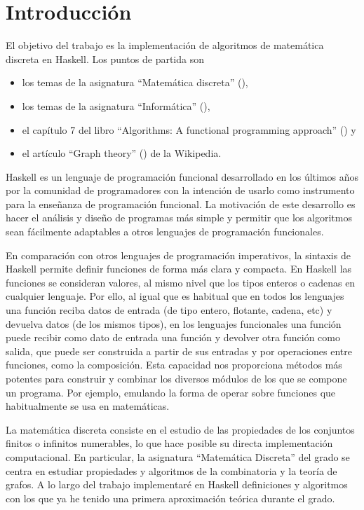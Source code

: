 \chapter*{Introducción}

El objetivo del trabajo es la implementación de algoritmos de matemática
discreta en Haskell. Los puntos de partida son 
\begin{itemize}
  \item los temas de la asignatura ``Matemática discreta'' (\cite{Cardenas-15a}),
  \item los temas de la asignatura ``Informática'' (\cite{Alonso-15a}),
  \item el capítulo 7 del libro ``Algorithms: A functional programming
    approach'' (\cite{Rabhi+Lapalme-99}) y
  \item el artículo ``Graph theory'' (\cite{Wikipedia-grafos}) de la Wikipedia.  
\end{itemize}

Haskell es un lenguaje de programación funcional desarrollado en los últimos
años por la comunidad de programadores con la intención de usarlo como
instrumento para la enseñanza de programación funcional. La motivación de este
desarrollo es hacer el análisis y diseño de programas más simple y permitir que
los algoritmos sean fácilmente adaptables a otros lenguajes de programación 
funcionales.

En comparación con otros lenguajes de programación imperativos, la sintaxis de 
Haskell permite definir funciones de forma más clara y compacta. En Haskell las
funciones se consideran valores, al mismo nivel que los tipos enteros o cadenas
en cualquier lenguaje. Por ello, al igual que es habitual que en todos los 
lenguajes una función reciba datos de entrada (de tipo entero, flotante, cadena,
etc) y devuelva datos (de los mismos tipos), en los lenguajes funcionales una
función puede recibir como dato de entrada una función y devolver otra función
como salida, que puede ser construida a partir de sus entradas y por operaciones
entre funciones, como la composición. Esta capacidad nos proporciona métodos más
potentes para construir y combinar los diversos módulos de los que se compone
un programa. Por ejemplo, emulando la forma de operar sobre funciones que 
habitualmente se usa en matemáticas.

La matemática discreta consiste en el estudio de las propiedades de los 
conjuntos finitos o infinitos numerables, lo que hace posible su directa
implementación computacional. En particular, la asignatura ``Matemática 
Discreta'' del grado se centra en estudiar propiedades y algoritmos de la 
combinatoria y la teoría de grafos. A lo largo del trabajo implementaré 
en Haskell definiciones y algoritmos con los que ya he tenido una primera 
aproximación teórica durante el grado.

